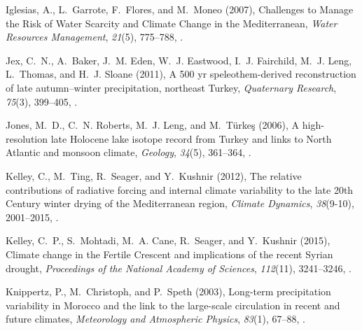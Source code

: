 \documentclass[draft,jgr]{AGUTeX}
\begin{document}
\begin{article}
\begin{thebibliography}{74}
Iglesias, A., L.~Garrote, F.~Flores, and M.~Moneo (2007), {Challenges to Manage
  the Risk of Water Scarcity and Climate Change in the Mediterranean},
  \textit{Water Resources Management}, \textit{21}(5), 775--788,
  .

Jex, C.~N., A.~Baker, J.~M. Eden, W.~J. Eastwood, I.~J. Fairchild, M.~J. Leng,
  L.~Thomas, and H.~J. Sloane (2011), {A 500 yr speleothem-derived
  reconstruction of late autumn--winter precipitation, northeast Turkey},
  \textit{Quaternary Research}, \textit{75}(3), 399--405, .

Jones, M.~D., C.~N. Roberts, M.~J. Leng, and M.~T{\"u}rke{\c{s}} (2006), {A
  high-resolution late Holocene lake isotope record from Turkey and links to
  North Atlantic and monsoon climate}, \textit{Geology}, \textit{34}(5),
  361--364, .

Kelley, C., M.~Ting, R.~Seager, and Y.~Kushnir (2012), {The relative
  contributions of radiative forcing and internal climate variability to the
  late 20th Century winter drying of the Mediterranean region}, \textit{Climate
  Dynamics}, \textit{38}(9-10), 2001--2015, .

Kelley, C.~P., S.~Mohtadi, M.~A. Cane, R.~Seager, and Y.~Kushnir (2015),
  {Climate change in the Fertile Crescent and implications of the recent Syrian
  drought}, \textit{Proceedings of the National Academy of Sciences},
  \textit{112}(11), 3241--3246, .

Knippertz, P., M.~Christoph, and P.~Speth (2003), {Long-term precipitation
  variability in Morocco and the link to the large-scale circulation in recent
  and future climates}, \textit{Meteorology and Atmospheric Physics},
  \textit{83}(1), 67--88, .


\end{thebibliography}
\end{article}
\end{document}
